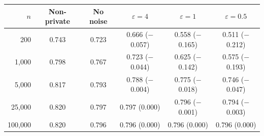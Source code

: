 \begin{tabular}{@{}rccccc@{}}
\toprule
$n$ & Non-private & No noise & $\varepsilon{=}4$ & $\varepsilon{=}1$ & $\varepsilon{=}0.5$ \\
\midrule
200 & 0.743 & 0.723 & 0.666 {\scriptsize($-$0.057)} & 0.558 {\scriptsize($-$0.165)} & 0.511 {\scriptsize($-$0.212)} \\
1,000 & 0.798 & 0.767 & 0.723 {\scriptsize($-$0.044)} & 0.625 {\scriptsize($-$0.142)} & 0.575 {\scriptsize($-$0.193)} \\
5,000 & 0.817 & 0.793 & 0.788 {\scriptsize($-$0.004)} & 0.775 {\scriptsize($-$0.018)} & 0.746 {\scriptsize($-$0.047)} \\
25,000 & 0.820 & 0.797 & 0.797 {\scriptsize(0.000)} & 0.796 {\scriptsize($-$0.001)} & 0.794 {\scriptsize($-$0.003)} \\
100,000 & 0.820 & 0.796 & 0.796 {\scriptsize(0.000)} & 0.796 {\scriptsize(0.000)} & 0.796 {\scriptsize(0.000)} \\
\bottomrule
\end{tabular}
